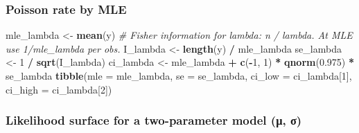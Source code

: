 \documentclass[
]{article}
\newenvironment{Shaded}{\begin{snugshade}}{\end{snugshade}}
\newcommand{\AttributeTok}[1]{\textcolor[rgb]{0.13,0.29,0.53}{#1}}
\newcommand{\CommentTok}[1]{\textcolor[rgb]{0.56,0.35,0.01}{\textit{#1}}}
\newcommand{\ConstantTok}[1]{\textcolor[rgb]{0.56,0.35,0.01}{#1}}
\newcommand{\DecValTok}[1]{\textcolor[rgb]{0.00,0.00,0.81}{#1}}
\newcommand{\FloatTok}[1]{\textcolor[rgb]{0.00,0.00,0.81}{#1}}
\newcommand{\FunctionTok}[1]{\textcolor[rgb]{0.13,0.29,0.53}{\textbf{#1}}}
\newcommand{\NormalTok}[1]{#1}
\newcommand{\OtherTok}[1]{\textcolor[rgb]{0.56,0.35,0.01}{#1}}
\newcommand{\SpecialCharTok}[1]{\textcolor[rgb]{0.81,0.36,0.00}{\textbf{#1}}}
\newcommand{\StringTok}[1]{\textcolor[rgb]{0.31,0.60,0.02}{#1}}
\begin{document}
\begin{Shaded}
\end{Shaded}

\subsubsection{Poisson rate by MLE}\label{poisson-rate-by-mle}

\begin{Shaded}
\begin{Highlighting}[]
\NormalTok{mle\_lambda }\OtherTok{\textless{}{-}} \FunctionTok{mean}\NormalTok{(y)}
\CommentTok{\# Fisher information for lambda: n / lambda. At MLE use 1/mle\_lambda per obs.}
\NormalTok{I\_lambda }\OtherTok{\textless{}{-}} \FunctionTok{length}\NormalTok{(y) }\SpecialCharTok{/}\NormalTok{ mle\_lambda}
\NormalTok{se\_lambda }\OtherTok{\textless{}{-}} \DecValTok{1} \SpecialCharTok{/} \FunctionTok{sqrt}\NormalTok{(I\_lambda)}
\NormalTok{ci\_lambda }\OtherTok{\textless{}{-}}\NormalTok{ mle\_lambda }\SpecialCharTok{+} \FunctionTok{c}\NormalTok{(}\SpecialCharTok{{-}}\DecValTok{1}\NormalTok{, }\DecValTok{1}\NormalTok{) }\SpecialCharTok{*} \FunctionTok{qnorm}\NormalTok{(}\FloatTok{0.975}\NormalTok{) }\SpecialCharTok{*}\NormalTok{ se\_lambda}
\FunctionTok{tibble}\NormalTok{(}\AttributeTok{mle =}\NormalTok{ mle\_lambda, }\AttributeTok{se =}\NormalTok{ se\_lambda,}
       \AttributeTok{ci\_low =}\NormalTok{ ci\_lambda[}\DecValTok{1}\NormalTok{], }\AttributeTok{ci\_high =}\NormalTok{ ci\_lambda[}\DecValTok{2}\NormalTok{])}
\end{Highlighting}
\end{Shaded}

\subsubsection{Likelihood surface for a two-parameter model (μ,
σ)}\label{likelihood-surface-for-a-two-parameter-model-ux3bc-ux3c3}
\end{document}

